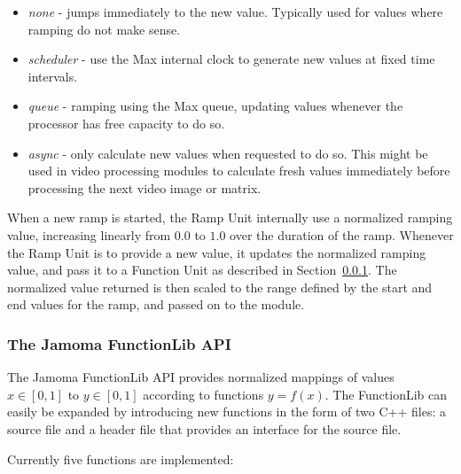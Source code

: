 \documentclass{sig-alternate}
\begin{document}
\begin{itemize}

	\item \emph{none} - jumps immediately to the new value. Typically used for values where ramping do not make sense.

	\item \emph{scheduler} - use the Max internal clock to generate new values at fixed time intervals.

	\item \emph{queue} - ramping using the Max queue, updating values whenever the processor has free capacity to do so.

	\item \emph{async} - only calculate new values when requested to do so. This might be used in video processing modules to calculate fresh values immediately before processing the next video image or matrix.
	
\end{itemize}

When a new ramp is started, the Ramp Unit internally use a normalized ramping value, increasing linearly from $0.0$ to $1.0$ over the duration of the ramp. Whenever the Ramp Unit is to provide a new value, it updates the normalized ramping value, and pass it to a Function Unit as described in Section~\ref{ssub:the_function_lib}. The normalized value returned is then scaled to the range defined by the start and end values for the ramp, and passed on to the module.




\subsubsection{The Jamoma FunctionLib API} %
\label{ssub:the_function_lib}

The Jamoma FunctionLib API provides normalized mappings of values $x \in [0,1]$ to $y \in [0,1]$ according to functions $y = f(x)$. The FunctionLib can easily be expanded by introducing new functions in the form of two C++ files: a source file and a header file that provides an interface for the source file.

Currently five functions are implemented: 
\end{document}
